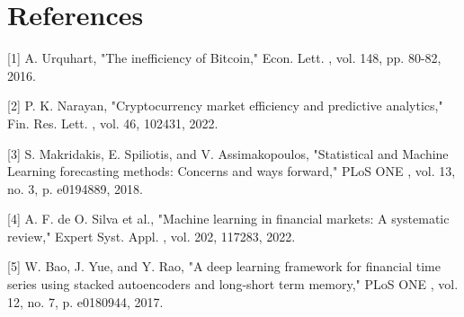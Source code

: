 \documentclass[10pt,a4paper]{article}
\begin{document}
\section*{References}
[1] A. Urquhart, "The inefficiency of Bitcoin," Econ. Lett. , vol. 148, pp. 80-82, 2016.

[2] P. K. Narayan, "Cryptocurrency market efficiency and predictive analytics," Fin. Res. Lett. , vol. 46, 102431, 2022.

[3] S. Makridakis, E. Spiliotis, and V. Assimakopoulos, "Statistical and Machine Learning forecasting methods: Concerns and ways forward," PLoS ONE , vol. 13, no. 3, p. e0194889, 2018.

[4] A. F. de O. Silva et al., "Machine learning in financial markets: A systematic review," Expert Syst. Appl. , vol. 202, 117283, 2022.

[5] W. Bao, J. Yue, and Y. Rao, "A deep learning framework for financial time series using stacked autoencoders and long-short term memory," PLoS ONE , vol. 12, no. 7, p. e0180944, 2017.
\end{document}
